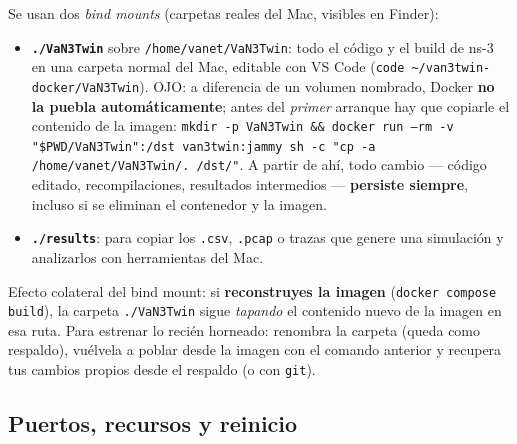 \documentclass[11pt,a4paper]{article}
\begin{document}
\begin{implicacion}
Se usan dos \emph{bind mounts} (carpetas reales del Mac, visibles en Finder):
\begin{itemize}
  \item \textbf{\texttt{./VaN3Twin}} sobre \texttt{/home/vanet/VaN3Twin}: todo
  el c\'odigo y el build de ns-3 en una carpeta normal del Mac, editable con
  VS Code (\texttt{code \textasciitilde/van3twin-docker/VaN3Twin}). OJO: a
  diferencia de un volumen nombrado, Docker \textbf{no la puebla
  autom\'aticamente}; antes del \emph{primer} arranque hay que copiarle el
  contenido de la imagen: \texttt{mkdir -p VaN3Twin \&\& docker run --rm -v
  "\$PWD/VaN3Twin":/dst van3twin:jammy sh -c "cp -a /home/vanet/VaN3Twin/.
  /dst/"}. A partir de ah\'i, todo cambio --- c\'odigo editado,
  recompilaciones, resultados intermedios --- \textbf{persiste siempre},
  incluso si se eliminan el contenedor y la imagen.
  \item \textbf{\texttt{./results}}: para copiar los \texttt{.csv},
  \texttt{.pcap} o trazas que genere una simulaci\'on y analizarlos con
  herramientas del Mac.
\end{itemize}
\end{implicacion}

\begin{advertencia}
Efecto colateral del bind mount: si \textbf{reconstruyes la imagen}
(\texttt{docker compose build}), la carpeta \texttt{./VaN3Twin} sigue
\emph{tapando} el contenido nuevo de la imagen en esa ruta. Para estrenar lo
reci\'en horneado: renombra la carpeta (queda como respaldo), vu\'elvela a
poblar desde la imagen con el comando anterior y recupera tus cambios propios
desde el respaldo (o con \texttt{git}).
\end{advertencia}

\subsection{Puertos, recursos y reinicio}
\end{document}
